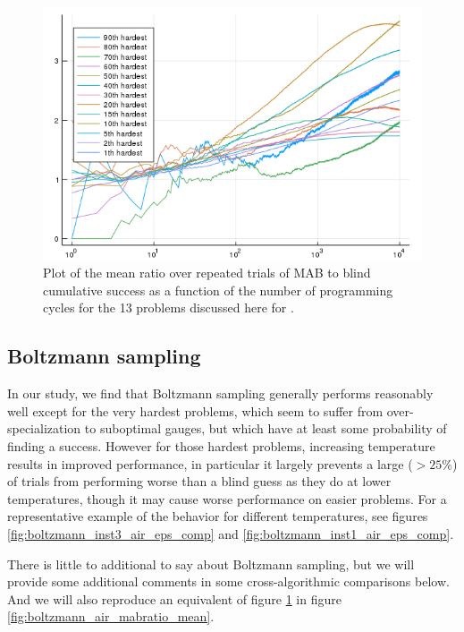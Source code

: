 \begin{figure}
    \includegraphics[width=0.8\columnwidth]{epsilon_air_mabratio_mean.png}
    \caption{Plot of the mean ratio over repeated trials of MAB to blind cumulative success as a function of the number of programming cycles for the 13 problems discussed here for \eg.}
    \label{fig:epsilon_air_mabratio_mean}
\end{figure}

\subsection{Boltzmann sampling}

In our study, we find that Boltzmann sampling generally performs reasonably well except for the very hardest problems, which seem to suffer from over-specialization to suboptimal gauges, but which have at least some probability of finding a success. However for those hardest problems, increasing temperature results in improved performance, in particular it largely prevents a large ($>25\%$) of trials from performing worse than a blind guess as they do at lower temperatures, though it may cause worse performance on easier problems. For a representative example of the behavior for different temperatures, see figures \ref{fig:boltzmann_inst3_air_eps_comp} and \ref{fig:boltzmann_inst1_air_eps_comp}.

There is little to additional to say about Boltzmann sampling, but we will provide some additional comments in some cross-algorithmic comparisons below. And we will also reproduce an equivalent of figure \ref{fig:epsilon_air_mabratio_mean} in figure \ref{fig:boltzmann_air_mabratio_mean}.

